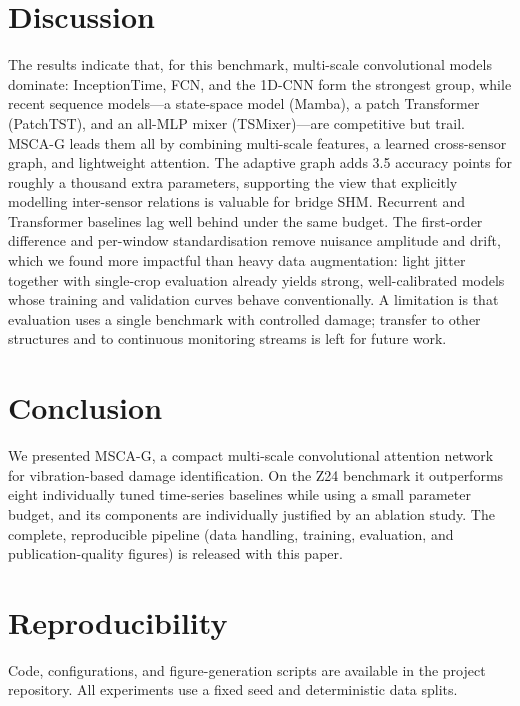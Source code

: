 \documentclass[11pt]{article}
\begin{document}
\section{Discussion}
The results indicate that, for this benchmark, multi-scale convolutional models
dominate: InceptionTime, FCN, and the 1D-CNN form the strongest group, while
recent sequence models---a state-space model (Mamba), a patch Transformer
(PatchTST), and an all-MLP mixer (TSMixer)---are competitive but trail. MSCA-G
leads them all by combining multi-scale features, a learned cross-sensor graph,
and lightweight attention. The adaptive graph adds \num{3.5} accuracy points for
roughly a thousand extra parameters, supporting the view that explicitly
modelling inter-sensor relations is valuable
for bridge SHM. Recurrent and Transformer baselines lag well behind under the
same budget. The first-order
difference and per-window standardisation remove nuisance amplitude and drift,
which we found more impactful than heavy data augmentation: light jitter together
with single-crop evaluation already yields strong, well-calibrated models whose
training and validation curves behave conventionally. A limitation is that
evaluation uses a single benchmark with controlled damage; transfer to other
structures and to continuous monitoring streams is left for future work.

\section{Conclusion}
We presented MSCA-G, a compact multi-scale convolutional attention network for
vibration-based damage identification. On the Z24 benchmark it outperforms eight
individually tuned time-series baselines while using a small parameter budget,
and its components are individually justified by an ablation study. The complete,
reproducible
pipeline (data handling, training, evaluation, and publication-quality figures)
is released with this paper.

\section*{Reproducibility}
Code, configurations, and figure-generation scripts are available in the project
repository. All experiments use a fixed seed and deterministic data splits.



\end{document}

